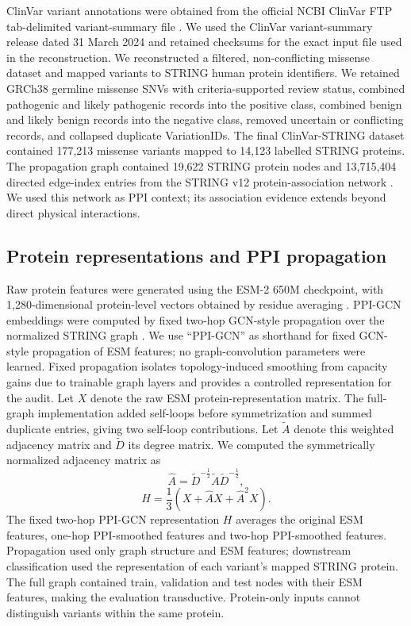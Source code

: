 \documentclass[conference]{IEEEtran}
\begin{document}
ClinVar variant annotations were obtained from the official NCBI ClinVar FTP tab-delimited variant-summary file \cite{Landrum2020ClinVar}. We used the ClinVar variant-summary release dated 31 March 2024 and retained checksums for the exact input file used in the reconstruction. We reconstructed a filtered, non-conflicting missense dataset and mapped variants to STRING human protein identifiers. We retained GRCh38 germline missense SNVs with criteria-supported review status, combined pathogenic and likely pathogenic records into the positive class, combined benign and likely benign records into the negative class, removed uncertain or conflicting records, and collapsed duplicate VariationIDs. The final ClinVar-STRING dataset contained 177,213 missense variants mapped to 14,123 labelled STRING proteins. The propagation graph contained 19,622 STRING protein nodes and 13,715,404 directed edge-index entries from the STRING v12 protein-association network \cite{Szklarczyk2023STRING}. We used this network as PPI context; its association evidence extends beyond direct physical interactions.

\subsection{Protein representations and PPI propagation}

Raw protein features were generated using the ESM-2 650M checkpoint, with 1,280-dimensional protein-level vectors obtained by residue averaging \cite{Lin2023ESM}. PPI-GCN embeddings were computed by fixed two-hop GCN-style propagation over the normalized STRING graph \cite{Kipf2017GCN}. We use ``PPI-GCN'' as shorthand for fixed GCN-style propagation of ESM features; no graph-convolution parameters were learned. Fixed propagation isolates topology-induced smoothing from capacity gains due to trainable graph layers and provides a controlled representation for the audit. Let $X$ denote the raw ESM protein-representation matrix. The full-graph implementation added self-loops before symmetrization and summed duplicate entries, giving two self-loop contributions. Let $\tilde{A}$ denote this weighted adjacency matrix and $\tilde{D}$ its degree matrix. We computed the symmetrically normalized adjacency matrix as
\begin{equation}
\hat{A}=\tilde{D}^{-\frac{1}{2}}\tilde{A}\tilde{D}^{-\frac{1}{2}},
\end{equation}
\begin{equation}
H=\frac{1}{3}\left(X+\hat{A}X+\hat{A}^{2}X\right).
\end{equation}
The fixed two-hop PPI-GCN representation $H$ averages the original ESM features, one-hop PPI-smoothed features and two-hop PPI-smoothed features. Propagation used only graph structure and ESM features; downstream classification used the representation of each variant's mapped STRING protein. The full graph contained train, validation and test nodes with their ESM features, making the evaluation transductive. Protein-only inputs cannot distinguish variants within the same protein.
\end{document}
